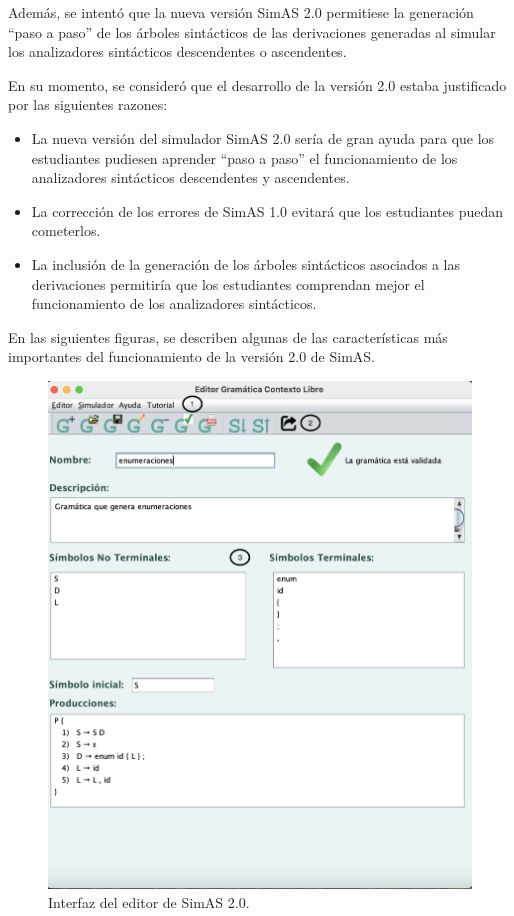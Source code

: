 Además, se intentó que la nueva versión  SimAS 2.0 permitiese la generación ``paso a paso'' de los árboles sintácticos de las derivaciones generadas al simular los analizadores sintácticos descendentes o ascendentes.


En su momento, se consideró que el desarrollo de la versión 2.0 estaba justificado por las siguientes razones:
\begin{itemize}
     \item La nueva versión del simulador SimAS 2.0 sería de gran ayuda para que los estudiantes pudiesen aprender ``paso a paso'' el funcionamiento de los analizadores sintácticos descendentes y ascendentes.
     \item La corrección de los errores de SimAS 1.0 evitará que los estudiantes puedan cometerlos.
     \item La inclusión de la generación de los árboles sintácticos asociados a las derivaciones permitiría que los estudiantes comprendan mejor el funcionamiento de los analizadores sintácticos.
\end{itemize}

En las siguientes figuras, se describen algunas de las características más importantes del funcionamiento de la versión 2.0 de SimAS.
 
\begin{figure}[p]
 	\begin{center}
      \includegraphics[scale=0.5]{figuras/Cap3/SimAS2/editor.png} 
       \caption{Interfaz del editor de SimAS 2.0.}\label{fig:SimAS-2.0-editor}
 	\end{center}
\end{figure}


